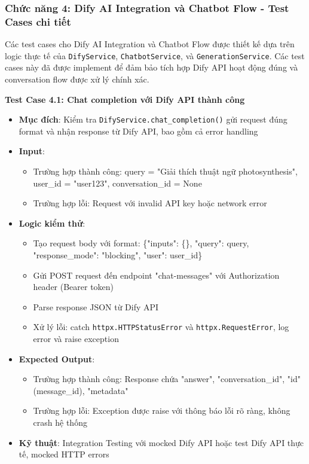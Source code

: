 \documentclass[../DoAn.tex]{subfiles}
\begin{document}
\subsubsection{Chức năng 4: Dify AI Integration và Chatbot Flow - Test Cases chi tiết}

Các test cases cho Dify AI Integration và Chatbot Flow được thiết kế dựa trên logic thực tế của \texttt{DifyService}, \texttt{ChatbotService}, và \texttt{GenerationService}. Các test cases này đã được implement để đảm bảo tích hợp Dify API hoạt động đúng và conversation flow được xử lý chính xác.

\textbf{Test Case 4.1: Chat completion với Dify API thành công}
\begin{itemize}
    \item \textbf{Mục đích}: Kiểm tra \texttt{DifyService.chat\_completion()} gửi request đúng format và nhận response từ Dify API, bao gồm cả error handling
    \item \textbf{Input}: 
    \begin{itemize}
        \item Trường hợp thành công: query = "Giải thích thuật ngữ photosynthesis", user\_id = "user123", conversation\_id = None
        \item Trường hợp lỗi: Request với invalid API key hoặc network error
    \end{itemize}
    \item \textbf{Logic kiểm thử}: 
    \begin{itemize}
        \item Tạo request body với format: \{"inputs": \{\}, "query": query, "response\_mode": "blocking", "user": user\_id\}
        \item Gửi POST request đến endpoint "chat-messages" với Authorization header (Bearer token)
        \item Parse response JSON từ Dify API
        \item Xử lý lỗi: catch \texttt{httpx.HTTPStatusError} và \texttt{httpx.RequestError}, log error và raise exception
    \end{itemize}
    \item \textbf{Expected Output}: 
    \begin{itemize}
        \item Trường hợp thành công: Response chứa "answer", "conversation\_id", "id" (message\_id), "metadata"
        \item Trường hợp lỗi: Exception được raise với thông báo lỗi rõ ràng, không crash hệ thống
    \end{itemize}
    \item \textbf{Kỹ thuật}: Integration Testing với mocked Dify API hoặc test Dify API thực tế, mocked HTTP errors
\end{itemize}
\end{document}
